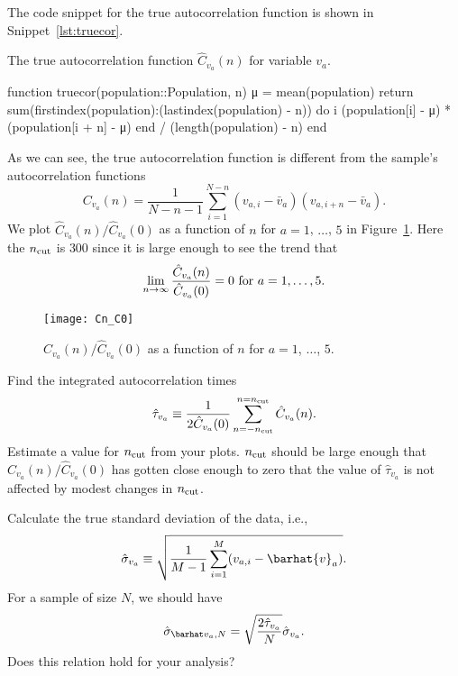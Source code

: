 \Answer{}
The code snippet for the true autocorrelation function is shown in Snippet~\ref{lst:truecor}.
%
\begin{algorithm}
    \caption{The true autocorrelation function $\hat{C}_{v_a}(n)$ for variable $v_a$.}
    \label{lst:truecor}
    \begin{juliacode}
        function truecor(population::Population, n)
            μ = mean(population)
            return sum(firstindex(population):(lastindex(population) - n)) do i
                (population[i] - μ) * (population[i + n] - μ)
            end / (length(population) - n)
        end
    \end{juliacode}
\end{algorithm}
%
As we can see, the true autocorrelation function is different from the sample's
autocorrelation functions
%
\begin{equation}
    C_{v_a}(n) = \frac{ 1 }{ N - n - 1 }
    \sum_{i=1}^{N-n} (v_{a,i} - \bar{v}_a) (v_{a,i + n} - \bar{v}_a).
\end{equation}
%
We plot $\hat{C}_{v_a}(n) / \hat{C}_{v_a}(0)$ as a function of $n$ for $a = 1$, $\ldots$,
$5$ in Figure~\ref{fig:truecor}.
Here the $n_\textnormal{cut}$ is $300$ since it is large enough to see the trend
that
%
\begin{equation}
    \lim_{n \rightarrow \infty} \frac{ \hat{C}_{v_a}(n) }{ \hat{C}_{v_a}(0) } = 0
    \textnormal{  for } a = 1, \ldots, 5.
\end{equation}

\begin{figure}[h]
    \centering
    \texttt{[image: Cn\_C0]}
    \caption{$\hat{C}_{v_a}(n) / \hat{C}_{v_a}(0)$ as a function of $n$ for
        $a = 1$, $\ldots$, $5$.}
    \label{fig:truecor}
\end{figure}

\Question{} Find the integrated autocorrelation times
%
\begin{equation}
    \hat{\tau}_{v_a} \equiv \frac{ 1 }{ 2 \hat{C}_{v_a}(0) }
    \sum_{n=-n_\textnormal{cut}}^{n=n_\textnormal{cut}} \hat{C}_{v_a}(n).
\end{equation}
%
Estimate a value for $n_\textnormal{cut}$ from your plots.
$n_\textnormal{cut}$ should be large enough that $\hat{C}_{v_a}(n) / \hat{C}_{v_a}(0)$
has gotten close enough to zero that the value of $\hat{\tau}_{v_a}$
is not affected by modest changes in $n_\textnormal{cut}$.


\Question{} Calculate the true standard deviation of the data, i.e.,
%
\begin{equation}
    \hat{\sigma}_{v_a} \equiv \sqrt{\frac{ 1 }{ M - 1 }
        \sum_{i=1}^M (v_{a,i} - \barhat{v}_a)}.
\end{equation}
%
For a sample of size $N$, we should have
%
\begin{equation}
    \sgbar{a} = \sqrt{\frac{ 2 \hat{\tau}_{v_a} }{ N }} \hat{\sigma}_{v_a}.
\end{equation}
%
Does this relation hold for your analysis?

